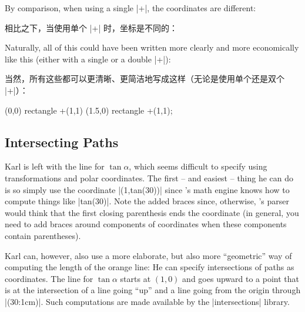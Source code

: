 By comparison, when using a single |+|, the coordinates are different:
%

相比之下，当使用单个 |+| 时，坐标是不同的：

\begin{codeexample}[]
\end{codeexample}


Naturally, all of this could have been written more clearly and more
economically like this (either with a single or a double |+|):

当然，所有这些都可以更清晰、更简洁地写成这样（无论是使用单个还是双个 |+|）：

\begin{codeexample}[]
\tikz \draw (0,0) rectangle +(1,1)  (1.5,0) rectangle +(1,1);
\end{codeexample}







\subsection{Intersecting Paths}

Karl is left with the line for $\tan \alpha$, which seems difficult to specify
using transformations and polar coordinates. The first -- and easiest -- thing
he can do is so simply use the coordinate |(1,{tan(30)})| since \tikzname's
math engine knows how to compute things like |tan(30)|. Note the added braces
since, otherwise, \tikzname's parser would think that the first closing
parenthesis ends the coordinate (in general, you need to add braces around
components of coordinates when these components contain parentheses).

Karl can, however, also use a more elaborate, but also more ``geometric'' way
of computing the length of the orange line: He can specify intersections of
paths as coordinates. The line for $\tan \alpha$ starts at $(1,0)$ and goes
upward to a point that is at the intersection of a line going ``up'' and a line
going from the origin through |(30:1cm)|. Such computations are made available
by the |intersections| library.

